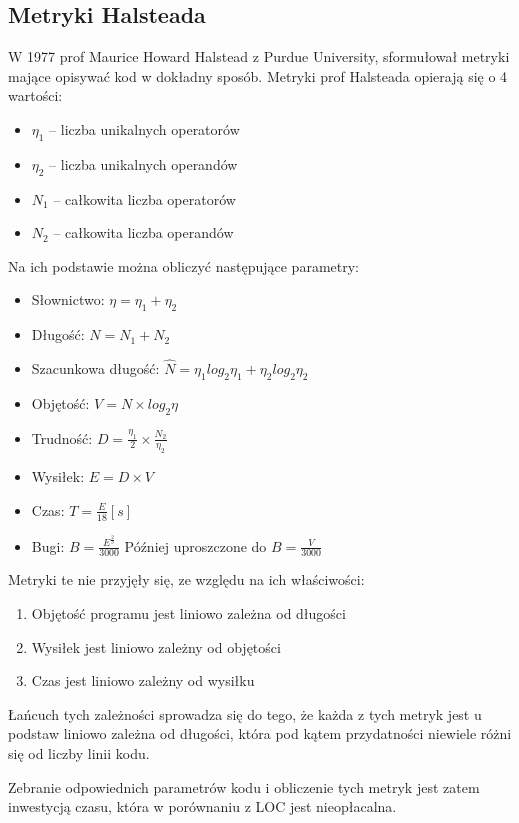 \subsection{Metryki Halsteada}
W 1977 prof Maurice Howard Halstead z Purdue University, sformułował metryki mające opisywać kod w dokładny sposób.\cite{halstead1977elements}
Metryki prof Halsteada opierają się o 4 wartości:
\begin{itemize}
    \item $\eta_1$ -- liczba unikalnych operatorów
    \item $\eta_2$ -- liczba unikalnych operandów
    \item $N_1$ -- całkowita liczba operatorów
    \item $N_2$ -- całkowita liczba operandów
\end{itemize}
\newpage
Na ich podstawie można obliczyć następujące parametry:
\begin{itemize}
    \item Słownictwo: $\eta = \eta_1 + \eta_2$
    \item Długość: $N = N_1 + N_2$
    \item Szacunkowa długość: $\hat{N} = \eta_1log_2\eta_1 + \eta_2log_2\eta_2$
    \item Objętość: $V = N \times log_2\eta$
    \item Trudność: $D = \frac{\eta_1}{2} \times \frac{N_2}{\eta_2}$
    \item Wysiłek: $E = D \times V$
    \item Czas: $T = \frac{E}{18}[s]$
    \item Bugi: $B = \frac{E^{\frac{2}{3}}}{3000}$ Później uproszczone do $B = \frac{V}{3000}$
\end{itemize}

Metryki te nie przyjęły się, ze względu na ich właściwości:
\begin{enumerate}
    \item Objętość programu jest liniowo zależna od długości
    \item Wysiłek jest liniowo zależny od objętości
    \item Czas jest liniowo zależny od wysiłku
\end{enumerate}
Łańcuch tych zależności sprowadza się do tego, że każda z tych metryk jest u podstaw liniowo zależna od długości, która pod kątem przydatności niewiele różni się od liczby linii kodu.

Zebranie odpowiednich parametrów kodu i obliczenie tych metryk jest zatem inwestycją czasu, która w porównaniu z LOC jest nieopłacalna.

